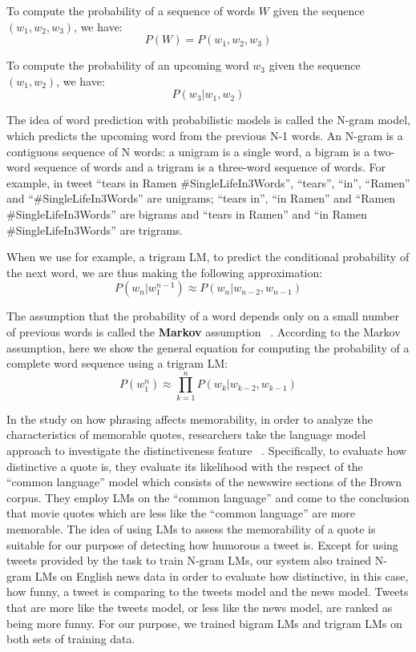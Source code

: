 \documentclass[11pt,a4paper]{article}
\begin{document}
To compute the probability of a sequence of words $W$ given the sequence $(w_{1},w_{2},w_{3})$, we have:
\begin{equation}
P(W) = P(w_{1},w_{2},w_{3})
\end{equation}

To compute the probability of an upcoming word $w_3$ given the sequence $(w_{1},w_{2})$, we have:
\begin{equation}
P(w_{3}|w_{1},w_{2})
\end{equation}

The idea of word prediction with probabilistic models is called the N-gram model, which predicts the upcoming word from the previous N-1 words. An N-gram is a contiguous sequence of N words: a unigram is a single word, a bigram is a two-word sequence of words and a trigram is a three-word sequence of words. For example, in tweet ``tears in Ramen \#SingleLifeIn3Words'', ``tears'', ``in'', ``Ramen'' and ``\#SingleLifeIn3Words'' are unigrams; ``tears in'', ``in Ramen'' and ``Ramen \#SingleLifeIn3Words'' are bigrams and ``tears in Ramen'' and ``in Ramen \#SingleLifeIn3Words'' are trigrams.

When we use for example, a trigram LM, to predict the conditional probability of the next word, we are thus making the following approximation:
\begin{equation}
P(w_n|w_1^{n-1})\approx P(w_n|w_{n-2}, w_{n-1})
\end{equation}

The assumption that the probability of a word depends only on a small number of previous words is called the \textbf{Markov} assumption ~\cite{markov1954theory}. According to the Markov assumption, here we show the general equation for computing the probability of a complete word sequence using a trigram LM:
\begin{equation}
P(w_1^n)\approx \prod_{k=1}^{n} P(w_k|w_{k-2}, w_{k-1})
\end{equation}

In the study on how phrasing affects memorability, in order to analyze the characteristics of memorable quotes, researchers take the language model approach to investigate the distinctiveness feature ~\cite{hello}. Specifically, to evaluate how distinctive a quote is, they evaluate its likelihood with the respect of the ``common language'' model which consists of the newswire sections of the Brown corpus. They employ LMs on the ``common language'' and come to the conclusion that movie quotes which are less like the ``common language'' are more memorable. The idea of using LMs to assess the memorability of a quote is suitable for our purpose of detecting how humorous a tweet is. Except for using tweets provided by the task to train N-gram LMs, our system also trained N-gram LMs on English news data in order to evaluate how distinctive, in this case, how funny, a tweet is comparing to the tweets model and the news model. Tweets that are more like the tweets model, or less like the news model, are ranked as being more funny. For our purpose, we trained bigram LMs and trigram LMs on both sets of training data.
\end{document}
